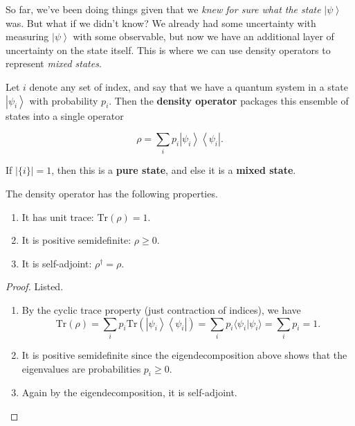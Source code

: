 \documentclass{article}
\newcommand{\ket}[1]{\ensuremath{\left|#1\right\rangle}}
\newcommand{\bra}[1]{\ensuremath{\left\langle#1\right|}}
\begin{document}
  So far, we've been doing things given that we \textit{knew for sure what the state } $\ket{\psi}$ was. But what if we didn't know? We already had some uncertainty with measuring $\ket{\psi}$ with some observable, but now we have an additional layer of uncertainty on the state itself. This is where we can use density operators to represent \textit{mixed states}. 

  \begin{definition}
    Let $i$ denote any set of index, and say that we have a quantum system in a state $\ket{\psi_i}$ with probability $p_i$. Then the \textbf{density operator} packages this ensemble of states into a single operator

      \[\rho = \sum_i p_i \ket{\psi_i} \bra{\psi_i}.\]

    If $|\{i\}| = 1$, then this is a \textbf{pure state}, and else it is a \textbf{mixed state}. 
  \end{definition}

  \begin{theorem}
    The density operator has the following properties. 
    \begin{enumerate}
      \item It has unit trace: $\text{Tr}(\rho) = 1$.
      \item It is positive semidefinite: $\rho \geq 0$.
      \item It is self-adjoint: $\rho^\dagger = \rho$.
    \end{enumerate}
  \end{theorem}
  \begin{proof} 
    Listed. 
    \begin{enumerate} 
      \item By the cyclic trace property (just contraction of indices), we have 
        \begin{equation} 
          \text{Tr}(\rho) = \sum_i p_i \text{Tr}(\ket{\psi_i} \bra{\psi_i}) = \sum_i p_i \langle \psi_i | \psi_i \rangle = \sum_i p_i = 1.
        \end{equation}
      \item It is positive semidefinite since the eigendecomposition above shows that the eigenvalues are probabilities $p_i \geq 0$. 
      \item Again by the eigendecomposition, it is self-adjoint. 
    \end{enumerate}
  \end{proof}
\end{document}
